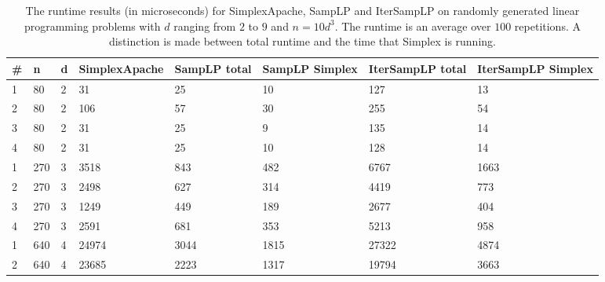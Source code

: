 \documentclass[nocopyrightspace]{acm_proc_article-sp}
\begin{document}
\begin{table}
\label{tab:relativeresults}
\centering
\caption{The runtime results (in microseconds) for SimplexApache, SampLP and IterSampLP on randomly generated linear programming problems with $d$ ranging from $2$ to $9$ and $n = 10d^3$. The runtime is an average over $100$ repetitions. A distinction is made between total runtime and the time that Simplex is running.}
\begin{tabular}{|l|l|l|l|l|l|l|l|} 
\hline
\#       & n    & d & SimplexApache & SampLP total & SampLP Simplex & IterSampLP total & IterSampLP Simplex \\ \hline
1        & 80   & 2 & 31                                                       & 25           & 10             & 127              & 13                 \\ \hline
2        & 80   & 2 & 106                                                      & 57           & 30             & 255              & 54                 \\ \hline
3        & 80   & 2 & 31                                                       & 25           & 9              & 135              & 14                 \\ \hline
4        & 80   & 2 & 31                                                       & 25           & 10             & 128              & 14                 \\ \hline
1        & 270  & 3 & 3518                                                     & 843          & 482            & 6767             & 1663               \\ \hline
2        & 270  & 3 & 2498                                                     & 627          & 314            & 4419             & 773                \\ \hline
3        & 270  & 3 & 1249                                                     & 449          & 189            & 2677             & 404                \\ \hline
4        & 270  & 3 & 2591                                                     & 681          & 353            & 5213             & 958                \\ \hline
1        & 640  & 4 & 24974                                                    & 3044         & 1815           & 27322            & 4874               \\ \hline
2        & 640  & 4 & 23685                                                    & 2223         & 1317           & 19794            & 3663               \\ \hline

\end{tabular}
\end{table}
\end{document}
